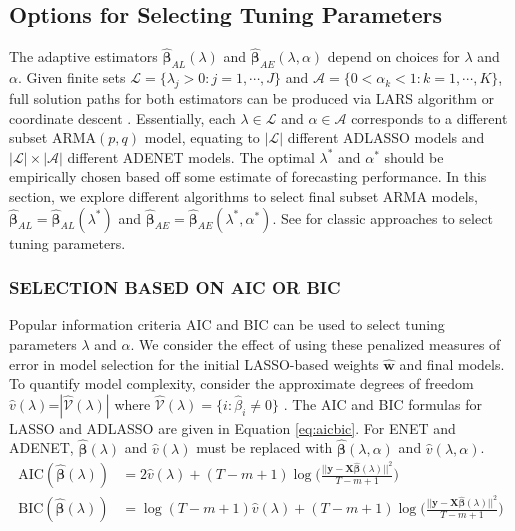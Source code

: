 \subsection{Options for Selecting Tuning Parameters}
The adaptive estimators $\hat{\bm{\beta}}_{AL} (\lambda)$ and $\hat{\bm{\beta}}_{AE} (\lambda,\alpha)$ depend on choices for $\lambda$ and $\alpha$. Given finite sets $\mathcal{L}=\{\lambda_j>0: j=1,\cdots,J\}$ and $\mathcal{A}=\{0<\alpha_k<1: k=1,\cdots,K\}$, full solution paths for both estimators can be produced via LARS algorithm \citep{Efron2004} or coordinate descent \citep{glmnet}. Essentially, each $\lambda\in\mathcal{L}$ and $\alpha\in\mathcal{A}$ corresponds to a different subset ARMA$(p,q)$ model, equating to $|\mathcal{L}|$ different ADLASSO models and $|\mathcal{L}|\times|\mathcal{A}|$ different ADENET models. The optimal $\lambda^*$ and $\alpha^*$ should be empirically chosen based off some estimate of forecasting performance. In this section, we explore different algorithms to select final subset ARMA models, $\hat{\bm{\beta}}_{AL}=\hat{\bm{\beta}}_{AL}(\lambda^*)$ and $\hat{\bm{\beta}}_{AE}=\hat{\bm{\beta}}_{AE}(\lambda^*,\alpha^*)$. See \citet[pp. 241-254]{Hastie2009a} for classic approaches to select tuning parameters.

\subsubsection{SELECTION BASED ON AIC OR BIC}

Popular information criteria AIC and BIC can be used to select tuning parameters $\lambda$ and $\alpha$. We consider the effect of using these penalized measures of error in model selection for the initial LASSO-based weights $\hat{\bm{w}}$ and final models. To quantify model complexity, consider the approximate degrees of freedom $\hat{v}(\lambda)$=$|\widehat{\mathcal{V}}(\lambda)|$ where $\widehat{\mathcal{V}}(\lambda)=\{i:\hat{\beta}_i\neq 0\}$ \citep{Zou2007}. The AIC and BIC formulas for LASSO and ADLASSO are given in Equation \ref{eq:aicbic}. For ENET and ADENET, $\hat{\bm{\beta}}(\lambda)$ and $\hat{v}(\lambda)$ must be replaced with $\hat{\bm{\beta}}(\lambda,\alpha)$ and $\hat{v}(\lambda,\alpha)$.
\begin{equation}
\label{eq:aicbic}
\begin{split}
\textrm{AIC}(\hat{\bm{\beta}}(\lambda))&=2\hat{v}(\lambda)+(T-m+1)\log\bigg(\frac{||\bm{y}-\bm{X}\hat{\bm{\beta}}(\lambda)||^2}{T-m+1}\bigg)\\
\textrm{BIC}(\hat{\bm{\beta}}(\lambda))&=\log(T-m+1)\hat{v}(\lambda)+(T-m+1)\log\bigg(\frac{||\bm{y}-\bm{X}\hat{\bm{\beta}}(\lambda)||^2}{T-m+1}\bigg)\\
\end{split}
\end{equation}

